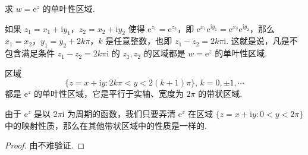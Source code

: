 \documentclass[../../main.tex]{subfiles}%
\begin{document}
\begin{proposition}\label{proposition:复变函数的指数函数的单叶性区域}
求 \( w = \mathrm{e}^z \) 的单叶性区域.
\end{proposition}
\begin{solution}
如果 \( z_1 = x_1 + \mathrm{i}y_1 \)，\( z_2 = x_2 + \mathrm{i}y_2 \) 使得 \( \mathrm{e}^{z_1} = \mathrm{e}^{z_2} \)，即 \( \mathrm{e}^{x_1} \mathrm{e}^{\mathrm{i}y_1} = \mathrm{e}^{x_2} \mathrm{e}^{\mathrm{i}y_2} \)，那么 \( x_1 = x_2 \)，\( y_1 = y_2 + 2k\pi \)，\( k \) 是任意整数，也即 \( z_1 - z_2 = 2k\pi \mathrm{i} \). 这就是说，凡是不包含满足条件 \( z_1 - z_2 = 2k\pi \mathrm{i} \) 的 \( z_1, z_2 \) 的区域都是 \( w = \mathrm{e}^z \) 的单叶性区域. 

\end{solution}

\begin{proposition}
区域
\[
\{ z = x + \mathrm{i}y : 2k\pi < y < 2(k + 1)\pi \}, \, k = 0, \pm 1, \cdots
\]
都是 \( \mathrm{e}^z \) 的单叶性区域，它是平行于实轴、宽度为 \( 2\pi \) 的带状区域.
\end{proposition}
\begin{note}
由于 \( \mathrm{e}^z \) 是以 \( 2\pi \mathrm{i} \) 为周期的函数，我们只要弄清 \( \mathrm{e}^z \) 在区域 \( \{ z = x + \mathrm{i}y : 0 < y < 2\pi \} \) 中的映射性质，那么在其他带状区域中的性质是一样的.
\end{note}
\begin{proof}
由不难验证.
\end{proof}
\end{document}
